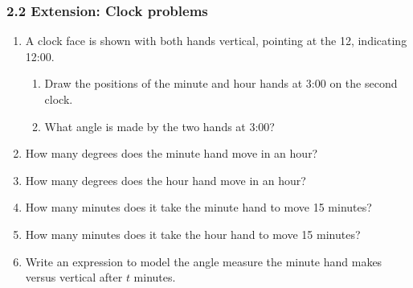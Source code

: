 

\fancyhead[LE]{\thepage}



\subsubsection*{2.2 Extension: Clock problems}
\begin{enumerate}[itemsep=0.5cm]
\item A clock face is shown with both hands vertical, pointing at the 12, indicating 12:00. 
\begin{enumerate}
  \item Draw the positions of the minute and hour hands at 3:00 on the second clock.
  \item What angle is made by the two hands at 3:00?
\end{enumerate}
   \hspace{2cm}

\item How many degrees does the minute hand move in an hour?
\item How many degrees does the hour hand move in an hour?
\item How many minutes does it take the minute hand to move 15 minutes?
\item How many minutes does it take the hour hand to move 15 minutes? 
\item Write an expression to model the angle measure the minute hand makes versus vertical after $t$ minutes. \vspace{0.5cm}


\end{enumerate}
